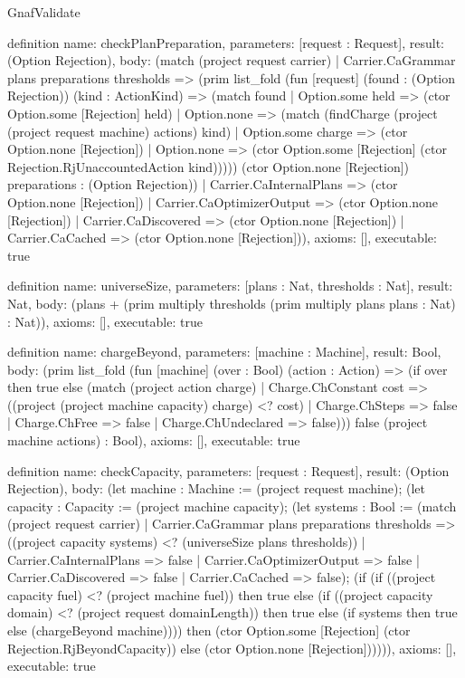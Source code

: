 \begin{lexlean}{GnafValidate}
\begin{semanticmodule}
definition{
  name: checkPlanPreparation,
  parameters: [request : Request],
  result: (Option Rejection),
  body: (match (project request carrier)
    | Carrier.CaGrammar plans preparations thresholds => (prim list_fold (fun [request] (found : (Option Rejection)) (kind : ActionKind) => (match found
      | Option.some held => (ctor Option.some [Rejection] held)
      | Option.none => (match (findCharge (project (project request machine) actions) kind)
        | Option.some charge => (ctor Option.none [Rejection])
        | Option.none => (ctor Option.some [Rejection] (ctor Rejection.RjUnaccountedAction kind))))) (ctor Option.none [Rejection]) preparations : (Option Rejection))
    | Carrier.CaInternalPlans => (ctor Option.none [Rejection])
    | Carrier.CaOptimizerOutput => (ctor Option.none [Rejection])
    | Carrier.CaDiscovered => (ctor Option.none [Rejection])
    | Carrier.CaCached => (ctor Option.none [Rejection])),
  axioms: [],
  executable: true
}

definition{
  name: universeSize,
  parameters: [plans : Nat, thresholds : Nat],
  result: Nat,
  body: (plans + (prim multiply thresholds (prim multiply plans plans : Nat) : Nat)),
  axioms: [],
  executable: true
}

definition{
  name: chargeBeyond,
  parameters: [machine : Machine],
  result: Bool,
  body: (prim list_fold (fun [machine] (over : Bool) (action : Action) => (if over then true else (match (project action charge)
    | Charge.ChConstant cost => ((project (project machine capacity) charge) <? cost)
    | Charge.ChSteps => false
    | Charge.ChFree => false
    | Charge.ChUndeclared => false))) false (project machine actions) : Bool),
  axioms: [],
  executable: true
}

definition{
  name: checkCapacity,
  parameters: [request : Request],
  result: (Option Rejection),
  body: (let machine : Machine := (project request machine); (let capacity : Capacity := (project machine capacity); (let systems : Bool := (match (project request carrier)
    | Carrier.CaGrammar plans preparations thresholds => ((project capacity systems) <? (universeSize plans thresholds))
    | Carrier.CaInternalPlans => false
    | Carrier.CaOptimizerOutput => false
    | Carrier.CaDiscovered => false
    | Carrier.CaCached => false); (if (if ((project capacity fuel) <? (project machine fuel)) then true else (if ((project capacity domain) <? (project request domainLength)) then true else (if systems then true else (chargeBeyond machine)))) then (ctor Option.some [Rejection] (ctor Rejection.RjBeyondCapacity)) else (ctor Option.none [Rejection]))))),
  axioms: [],
  executable: true
}


\end{semanticmodule}
\end{lexlean}
